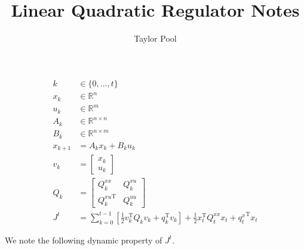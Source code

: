 \documentclass{article}
\begin{document}
\title{Linear Quadratic Regulator Notes}
\author{Taylor Pool}

\maketitle

\begin{align*}
    k &\in \{ 0, \ldots, t \} \\
    x_k &\in \mathbb{R}^n \\
    u_k &\in \mathbb{R}^m \\
    A_k &\in \mathbb{R}^{n \times n} \\
    B_k &\in \mathbb{R}^{n \times m} \\
    x_{k+1} &= A_k x_k + B_k u_k \\
    v_k &= \begin{bmatrix}
        x_k \\
        u_k
    \end{bmatrix} \\
    Q_k &= \begin{bmatrix}
        Q_k^{xx} & Q_k^{xu} \\
        {Q_k^{xu}}^\mathrm{T} & Q_k^{uu}
    \end{bmatrix} \\
    J^t &= \sum_{k=0}^{t-1} \left[ \frac{1}{2} v_k^\mathrm{T} Q_k v_k + q_k^\mathrm{T} v_k \right] + \frac{1}{2} x_t^\mathrm{T} Q_t^{xx} x_t + {q_t^x}^\mathrm{T} x_t
\end{align*}

We note the following dynamic property of $J^t$.
\end{document}
